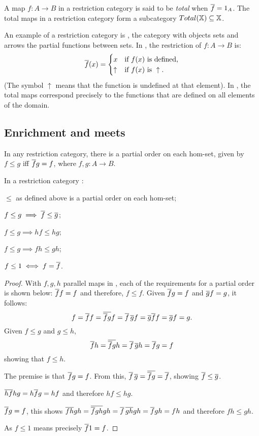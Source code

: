 A map $f:A\to B$ in a restriction category is said to be \emph{total} when
$\overline{f} = 1_A$. The total maps in a restriction category form a subcategory
$Total(\mathbb{X}) \subseteq \mathbb{X}$.

An example of a restriction category is \Par, the category with objects sets and arrows the partial
functions between sets. In \Par, the restriction of $f:A\to B$ is:
\[\overline{f}(x) =
\begin{cases}
  x&\text{if $f(x)$ is defined,}\\
  \uparrow&\text{if }f(x)\text{ is }\uparrow.
\end{cases}
\]
(The symbol $\uparrow$ means that the function is undefined at that element). In \Par, the
total maps correspond precisely to the functions that are defined on all elements of the domain.


\subsection{Enrichment and meets} %
\label{sub:enrichment_and_meets}


In any restriction category, there is a partial
order on each hom-set, given by $f \le g$ iff
$\overline{f} g = f$, where $f,g:A\to B$.
\begin{lemma}\label{lem:restriction_cats_are_partial_order_enriched}
 In a restriction category \X:
\bproofenum
\item  $\le$ as defined
above is a partial order on each hom-set;
\item $f \le g \implies \overline{f} \le \overline{g}$;
\item $f \le g \implies h f \le h g$;
\item $f \le g \implies f h \le g h$;
\item $f \le 1 \iff f = \overline{f}$.
\eproofenum
\end{lemma}
\begin{proof}
\bproofenum
\item With $f,g,h$ parallel maps in \X, each of the requirements for a
partial order is shown below:
\bd
{} $\overline{f} f = f$ and therefore, $ f \le f$.
 Given $\overline{f}g = f$ and $\overline{g}f = g$, it
follows:
\[f = \overline{f} f = \overline{\overline{f} g} f = \overline{f}\, \overline{g} f
  = \overline{g}\overline{f} f =  \overline{g} f = g.\]
 Given $f \le g$ and $g\le h$,
\[\overline{f} h = \overline{\overline{f} g} h = \overline{f}\, \overline{g} h = \overline{f} g = f\]
showing that $f \le h$.
\ed
\item The premise is that $\overline{f} g = f$. From this,
$ \overline{f}\, \overline{g} = \overline{\overline{f} g} = \overline{f}$,
showing $\overline{f} \le \overline{g}$.
\item
$\overline{h f} hg = h \overline{f} g = h f$
and therefore $h f \le hg$.
\item $\overline{f} g = f$, this shows
$\overline{f h} g h = \overline{\overline{f} g h} g h
= \overline{f}\, \overline{g h} g h = \overline{f} g h = f h$
and therefore $f h \le g h$.
\item As $f \le 1$ means precisely $\overline{f}1 = f$.
\eproofenum
\end{proof}

